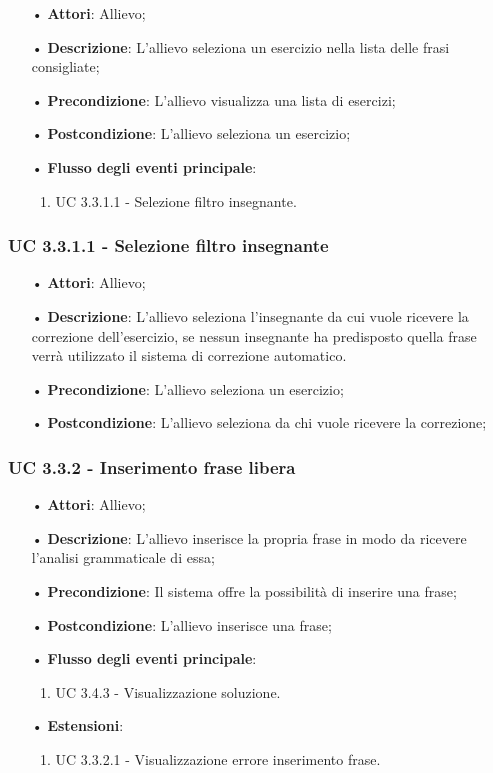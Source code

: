 \begin{itemize}
\item[•]\textbf{Attori}: Allievo;
\item[•]\textbf{Descrizione}: L'allievo seleziona un esercizio nella lista delle frasi consigliate;
\item[•]\textbf{Precondizione}: L'allievo visualizza una lista di esercizi;
\item[•]\textbf{Postcondizione}: L'allievo seleziona un esercizio;
\item[•]\textbf{Flusso degli eventi principale}:
\begin{enumerate}
\item UC 3.3.1.1 - Selezione filtro insegnante.
\end{enumerate}
\end{itemize}

\subsubsection{UC 3.3.1.1 - Selezione filtro insegnante}

\begin{itemize}
\item[•]\textbf{Attori}: Allievo;
\item[•]\textbf{Descrizione}: L'allievo seleziona l'insegnante da cui vuole ricevere la correzione dell'esercizio, se nessun insegnante ha predisposto quella frase verrà utilizzato il sistema di correzione automatico. %
\item[•]\textbf{Precondizione}: L'allievo seleziona un esercizio;
\item[•]\textbf{Postcondizione}: L'allievo seleziona da chi vuole ricevere la correzione;
\end{itemize}

\subsubsection{UC 3.3.2 - Inserimento frase libera}
\begin{itemize}
\item[•]\textbf{Attori}: Allievo;
\item[•]\textbf{Descrizione}: L'allievo inserisce la propria frase in modo da ricevere l'analisi grammaticale di essa;
\item[•]\textbf{Precondizione}: Il sistema offre la possibilità di inserire una frase;
\item[•]\textbf{Postcondizione}: L'allievo inserisce una frase;
\item[•]\textbf{Flusso degli eventi principale}:
\begin{enumerate}
\item UC 3.4.3 - Visualizzazione soluzione. %
\end{enumerate}
\item[•]\textbf{Estensioni}:
\begin{enumerate}
\item UC 3.3.2.1 - Visualizzazione errore inserimento frase. %
\end{enumerate}
\end{itemize}

